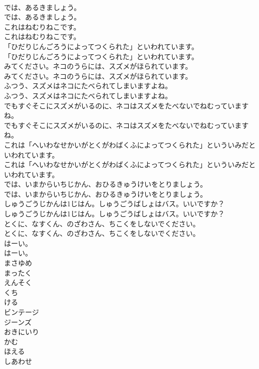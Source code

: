 \documentclass[8pt]{extreport}
\begin{document}
\begin{CJK}{UTF8}{min}
\\	では、あるきましょう。	
\\	では、あるきましょう。 
\\	これはねむりねこです。	
\\	これはねむりねこです。 
\\	「ひだりじんごろうによってつくられた」といわれています。	
\\	「ひだりじんごろうによってつくられた」といわれています。 
\\	みてください。ネコのうらには、スズメがほられています。	
\\	みてください。ネコのうらには、スズメがほられています。 
\\	ふつう、スズメはネコにたべられてしまいますよね。	
\\	ふつう、スズメはネコにたべられてしまいますよね。 
\\	でもすぐそこにスズメがいるのに、ネコはスズメをたべないでねむっていますね。	
\\	でもすぐそこにスズメがいるのに、ネコはスズメをたべないでねむっていますね。 
\\	これは「へいわなせかいがとくがわばくふによってつくられた」といういみだといわれています。	
\\	これは「へいわなせかいがとくがわばくふによってつくられた」といういみだといわれています。 
\\	では、いまからいちじかん、おひるきゅうけいをとりましょう。	
\\	では、いまからいちじかん、おひるきゅうけいをとりましょう。 
\\	しゅうごうじかんは1じはん。しゅうごうばしょはバス。いいですか？	
\\	しゅうごうじかんは1じはん。しゅうごうばしょはバス。いいですか？ 
\\	とくに、なすくん、のざわさん、ちこくをしないでください。	
\\	とくに、なすくん、のざわさん、ちこくをしないでください。 
\\	はーい。	
\\	はーい。 
\\	まさゆめ
\\	まったく
\\	えんそく
\\	くち
\\	ける
\\	ビンテージ
\\	ジーンズ
\\	おきにいり
\\	かむ
\\	ほえる
\\	しあわせ

\end{CJK}
\end{document}
